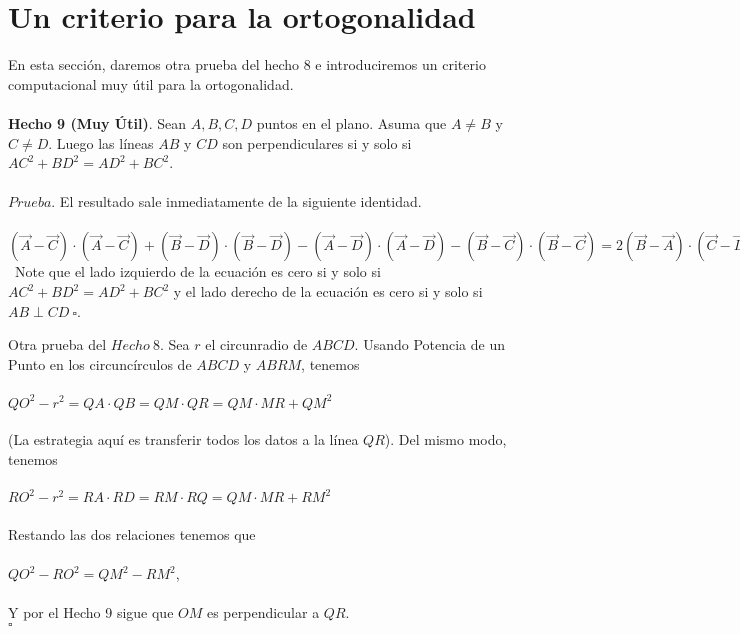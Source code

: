 \documentclass[11pt, a4paper]{article}
\begin{document}
	\setcounter{section}{4}
\section{Un criterio para la ortogonalidad}
En esta secci\'on, daremos otra prueba del hecho 8 e introduciremos un criterio computacional muy \'util para la ortogonalidad.
\\\\
\textbf{Hecho 9 (Muy \'Util)}. Sean $A, B, C, D$ puntos en el plano. Asuma que $A \ne B$ y $C \ne D$. Luego las l\'ineas $AB$ y $CD$ son perpendiculares si y solo si $AC^2 + BD^2 = AD^2 +BC^2$.
\\\\
$Prueba$. El resultado sale inmediatamente de la siguiente identidad.
\\\\
$(\vec{A} - \vec{C}) \cdot (\vec{A} - \vec{C})  + (\vec{B}- \vec{D}) \cdot (\vec{B}-\vec{D}) - (\vec{A}- \vec{D}) \cdot (\vec{A}-\vec{D}) -(\vec{B}-\vec{C}) \cdot (\vec{B}-\vec{C}) = 2(\vec{B}-\vec{A})\cdot(\vec{C}-\vec{D}) $
\\\
Note que el lado izquierdo de la ecuaci\'on es cero si y solo si $AC^2+BD^2 = AD^2+ BC^2$ y el lado derecho de la ecuaci\'on es cero si y solo si $AB \perp CD \  \square$.

Otra prueba del $Hecho \ 8$. Sea $r$ el circunradio de $ABCD$. Usando Potencia de un Punto en los circunc\'irculos de $ABCD$ y $ABRM$, tenemos
\\\\
$QO^2 - r^2 = QA \cdot QB = QM \cdot QR = QM \cdot MR + QM^2$
\\\\
(La estrategia aqu\'i es transferir todos los datos a la l\'inea $QR$). Del mismo modo, tenemos
\\\\
$RO^2 - r^2 =  RA \cdot RD = RM \cdot RQ = QM \cdot MR + RM^2$
\\\\
Restando las dos relaciones tenemos que
\\\\
$QO^2 - RO^2 = QM^2-RM^2$,
\\\\ 
Y por el Hecho 9 sigue que $OM$ es perpendicular a $QR$. \\ $\square$
\end{document}
